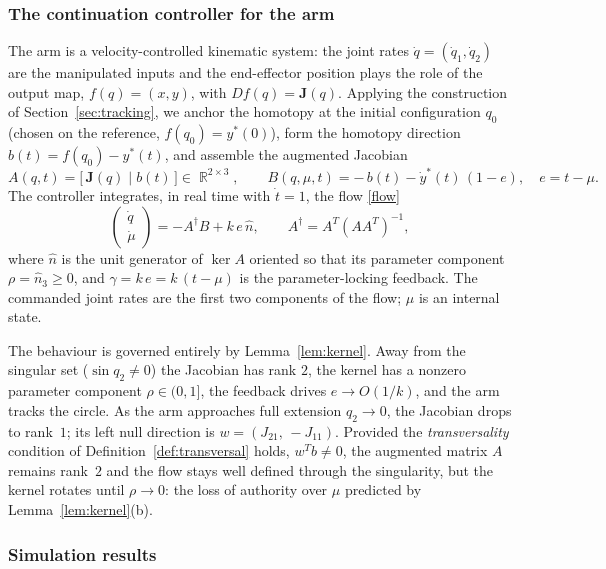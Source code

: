 \documentclass[11pt,american]{article}
\DeclareMathOperator{\R}{\mathbb{R}}
\theoremstyle{definition}
\theoremstyle{plain}
\theoremstyle{remark}
\begin{document}
\subsubsection{The continuation controller for the arm}

The arm is a velocity-controlled kinematic system: the joint rates $\dot q = (\dot q_1, \dot q_2)$ are the manipulated inputs and the end-effector position plays the role of the output map, $f(q) = (x,y)$, with $D f(q) = \mathbf{J}(q)$. Applying the construction of Section~\ref{sec:tracking}, we anchor the homotopy at the initial configuration $q_0$ (chosen on the reference, $f(q_0) = y^*(0)$), form the homotopy direction $b(t) = f(q_0) - y^*(t)$, and assemble the augmented Jacobian
\[
A(q,t) = \bigl[\, \mathbf{J}(q) \;\big|\; b(t) \,\bigr] \in \R^{2\times 3},
\qquad
B(q,\mu,t) = -\,b(t) - \dot y^*(t)\,(1-e), \quad e = t-\mu .
\]
The controller integrates, in real time with $\dot t = 1$, the flow \eqref{flow}
\[
\begin{pmatrix}\dot q \\ \dot\mu\end{pmatrix}
= -A^\dagger B + k\, e\, \hat n,
\qquad
A^\dagger = A^T (A A^T)^{-1},
\]
where $\hat n$ is the unit generator of $\ker A$ oriented so that its parameter component $\rho = \hat n_3 \ge 0$, and $\gamma = k\,e = k\,(t-\mu)$ is the parameter-locking feedback. The commanded joint rates are the first two components of the flow; $\mu$ is an internal state.

The behaviour is governed entirely by Lemma~\ref{lem:kernel}. Away from the singular set ($\sin q_2 \ne 0$) the Jacobian has rank $2$, the kernel has a nonzero parameter component $\rho\in(0,1]$, the feedback drives $e \to O(1/k)$, and the arm tracks the circle. As the arm approaches full extension $q_2 \to 0$, the Jacobian drops to rank~$1$; its left null direction is $w = (J_{21},\, -J_{11})$. Provided the \emph{transversality} condition of Definition~\ref{def:transversal} holds, $w^T b \ne 0$, the augmented matrix $A$ remains rank~$2$ and the flow stays well defined through the singularity, but the kernel rotates until $\rho \to 0$: the loss of authority over $\mu$ predicted by Lemma~\ref{lem:kernel}(b).

\subsubsection{Simulation results}
\end{document}
